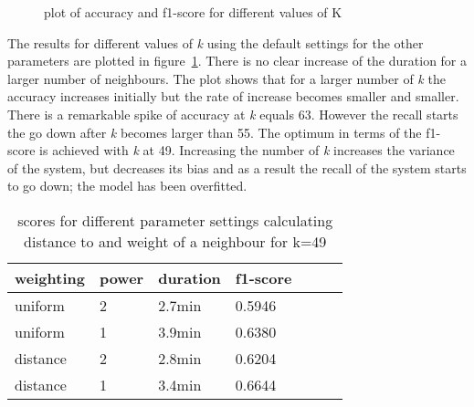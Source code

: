 \documentclass[11pt]{article}
\begin{document}
\begin{figure}
  \caption{plot of accuracy and f1-score for different values of K}
  \label{fig:tuning-knearest-k}
\end{figure}

The results for different values of \emph{k} using the default settings for the other parameters are plotted in figure~\ref{fig:tuning-knearest-k}. There is no clear increase of the duration for a larger number of neighbours. The plot shows that for a larger number of \emph{k} the accuracy increases initially but the rate of increase becomes smaller and smaller. There is a remarkable spike of accuracy at \emph{k} equals 63. However the recall starts the go down after \emph{k} becomes larger than 55. The optimum in terms of the f1-score is achieved with \emph{k} at 49. Increasing the number of \emph{k} increases the variance of the system, but decreases its bias and as a result the recall of the system starts to go down; the model has been overfitted.

\begin{table}[ht]\footnotesize
\centering
\begin{tabular}{ l l l l l l l }
weighting & power & duration & f1-score \\
\hline
uniform  & 2 & 2.7min & 0.5946 \\
uniform  & 1 & 3.9min & 0.6380 \\
distance & 2 & 2.8min & 0.6204 \\
distance & 1 & 3.4min & 0.6644 \\
\end{tabular}
\caption{scores for different parameter settings calculating distance to and weight of a neighbour for k=49}
\label{tab:tuning-knearest-dist}
\end{table}
\end{document}

